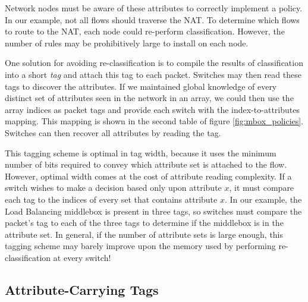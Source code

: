 Network nodes must be aware of these attributes to correctly implement a policy. In our example, not all flows should traverse the NAT. To determine which flows to route to the NAT, each node could re-perform classification. However, the number of rules may be prohibitively large to install on each node. 

One solution for avoiding re-classification is to compile the results of classification into a short \textit{tag} and attach this tag to each packet. Switches may then read these tags to discover the attributes. If we maintained global knowledge of every distinct set of attributes seen in the network in an array, we could then use the array indices as packet tags and provide each switch with the index-to-attributes mapping. This mapping is shown in the second table of figure \ref{fig:mbox_policies}. Switches can then recover all attributes by reading the tag. 


This tagging scheme is optimal in tag width, because it uses the minimum number of bits required to convey which attribute set is attached to the flow. However, optimal width comes at the cost of attribute reading complexity. If a switch wishes to make a decision based only upon attribute $x$, it must compare each tag to the indices of every set that contains attribute $x$. In our example, the Load Balancing middlebox is present in three tags, so switches must compare the packet's tag to each of the three tags to determine if the middlebox is in the attribute set. In general, if the number of attribute sets is large enough, this tagging scheme may barely improve upon the memory used by performing re-classification at every switch!







\subsection{Attribute-Carrying Tags}

